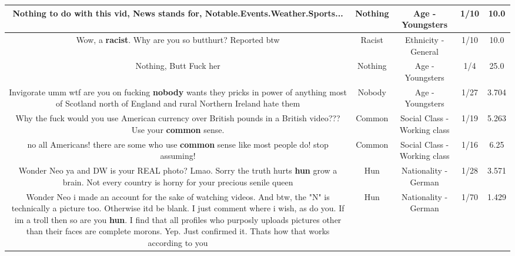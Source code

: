 \documentclass[11pt]{article}
\newlength\mylength
\begin{document}
\begin{center}
\begin{longtable}{|C{.65\mylength}|C{.30\mylength}|C{.12\mylength}|C{.12\mylength}|C{.12\mylength}|}
  \small Nothing to do with this vid, News stands for, Notable.Events.Weather.Sports...\normalsize   & Nothing & Age - Youngsters & 1/10 & 10.0 \\  \hline
  \small Wow, a \textbf{racist}. Why are you so butthurt? Reported btw\normalsize   & Racist & Ethnicity - General & 1/10 & 10.0 \\  \hline
  \small Nothing, Butt Fuck her\normalsize   & Nothing & Age - Youngsters & 1/4 & 25.0 \\  \hline
  \small Invigorate umm wtf are you on fucking \textbf{nobody} wants they pricks in power of anything most of Scotland north of England and rural Northern Ireland hate them\normalsize   & Nobody & Age - Youngsters & 1/27 & 3.704 \\  \hline
  \small Why the fuck would you use American currency over British pounds in a British video??? Use your \textbf{common} sense.\normalsize   & Common & Social Class - Working class & 1/19 & 5.263 \\  \hline
  \small no all Americans! there are some who use \textbf{common} sense like most people do! stop assuming!\normalsize   & Common & Social Class - Working class & 1/16 & 6.25 \\  \hline
  \small Wonder Neo ya and DW is your REAL photo? Lmao. Sorry the truth hurts \textbf{hun} grow a brain. Not every country is horny for your precious senile queen\normalsize   & Hun & Nationality - German & 1/28 & 3.571 \\  \hline
  \small Wonder Neo i made an account for the sake of watching videos. And btw, the "N" is technically a picture too. Otherwise itd be blank. I just comment where i wish, as do you. If im a troll then so are you \textbf{hun}. I find that all profiles who purposly uploads pictures other than their faces are complete morons. Yep. Just confirmed it. Thats how that works according to you\normalsize   & Hun & Nationality - German & 1/70 & 1.429 \\  \hline

\end{longtable}
\end{center}
\end{document}
